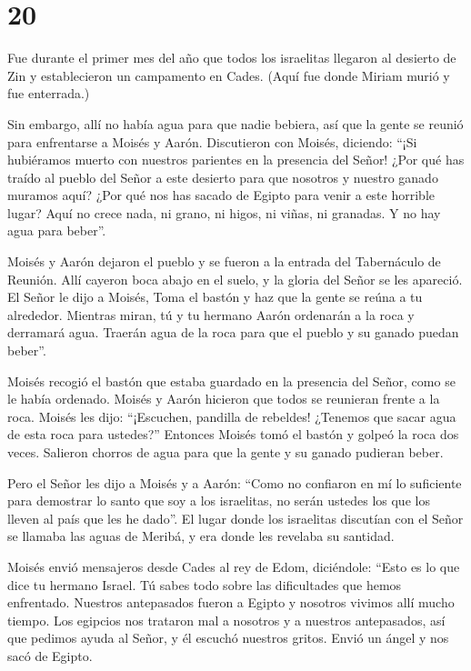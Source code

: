 \hypertarget{section-19}{%
\section{20}\label{section-19}}

 Fue durante el primer mes del año que todos los israelitas
llegaron al desierto de Zin y establecieron un campamento en Cades.
(Aquí fue donde Miriam murió y fue enterrada.)

 Sin embargo, allí no había agua para que nadie bebiera, así
que la gente se reunió para enfrentarse a Moisés y Aarón. 
Discutieron con Moisés, diciendo: ``¡Si hubiéramos muerto con nuestros
parientes en la presencia del Señor!  ¿Por qué has traído al
pueblo del Señor a este desierto para que nosotros y nuestro ganado
muramos aquí?  ¿Por qué nos has sacado de Egipto para venir
a este horrible lugar? Aquí no crece nada, ni grano, ni higos, ni viñas,
ni granadas. Y no hay agua para beber''.

 Moisés y Aarón dejaron el pueblo y se fueron a la entrada
del Tabernáculo de Reunión. Allí cayeron boca abajo en el suelo, y la
gloria del Señor se les apareció.  El Señor le dijo a
Moisés,  Toma el bastón y haz que la gente se reúna a tu
alrededor. Mientras miran, tú y tu hermano Aarón ordenarán a la roca y
derramará agua. Traerán agua de la roca para que el pueblo y su ganado
puedan beber''.

 Moisés recogió el bastón que estaba guardado en la
presencia del Señor, como se le había ordenado.  Moisés y
Aarón hicieron que todos se reunieran frente a la roca. Moisés les dijo:
``¡Escuchen, pandilla de rebeldes! ¿Tenemos que sacar agua de esta roca
para ustedes?''  Entonces Moisés tomó el bastón y golpeó la
roca dos veces. Salieron chorros de agua para que la gente y su ganado
pudieran beber.

 Pero el Señor les dijo a Moisés y a Aarón: ``Como no
confiaron en mí lo suficiente para demostrar lo santo que soy a los
israelitas, no serán ustedes los que los lleven al país que les he
dado''.  El lugar donde los israelitas discutían con el
Señor se llamaba las aguas de Meribá, y era donde les revelaba su
santidad.

 Moisés envió mensajeros desde Cades al rey de Edom,
diciéndole: ``Esto es lo que dice tu hermano Israel. Tú sabes todo sobre
las dificultades que hemos enfrentado.  Nuestros
antepasados fueron a Egipto y nosotros vivimos allí mucho tiempo. Los
egipcios nos trataron mal a nosotros y a nuestros antepasados,
 así que pedimos ayuda al Señor, y él escuchó nuestros
gritos. Envió un ángel y nos sacó de Egipto.

